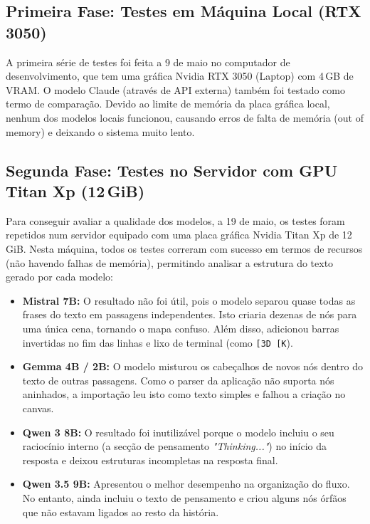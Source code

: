 \subsection{Primeira Fase: Testes em Máquina Local (RTX 3050)}
A primeira série de testes foi feita a 9 de maio no computador de desenvolvimento, que tem uma gráfica Nvidia RTX 3050 (Laptop) com 4\,GB de VRAM. O modelo Claude (através de API externa) também foi testado como termo de comparação. Devido ao limite de memória da placa gráfica local, nenhum dos modelos locais funcionou, causando erros de falta de memória (out of memory) e deixando o sistema muito lento.

\subsection{Segunda Fase: Testes no Servidor com GPU Titan Xp (12\,GiB)}
Para conseguir avaliar a qualidade dos modelos, a 19 de maio, os testes foram repetidos num servidor equipado com uma placa gráfica Nvidia Titan Xp de 12\,GiB. Nesta máquina, todos os testes correram com sucesso em termos de recursos (não havendo falhas de memória), permitindo analisar a estrutura do texto gerado por cada modelo:
\begin{itemize}
    \item \textbf{Mistral 7B:} O resultado não foi útil, pois o modelo separou quase todas as frases do texto em passagens independentes. Isto criaria dezenas de nós para uma única cena, tornando o mapa confuso. Além disso, adicionou barras invertidas no fim das linhas e lixo de terminal (como \texttt{[3D [K}).
    \item \textbf{Gemma 4B / 2B:} O modelo misturou os cabeçalhos de novos nós dentro do texto de outras passagens. Como o parser da aplicação não suporta nós aninhados, a importação leu isto como texto simples e falhou a criação no canvas.
    \item \textbf{Qwen 3 8B:} O resultado foi inutilizável porque o modelo incluiu o seu raciocínio interno (a secção de pensamento \textit{"Thinking..."}) no início da resposta e deixou estruturas incompletas na resposta final.
    \item \textbf{Qwen 3.5 9B:} Apresentou o melhor desempenho na organização do fluxo. No entanto, ainda incluiu o texto de pensamento e criou alguns nós órfãos que não estavam ligados ao resto da história.
\end{itemize}

